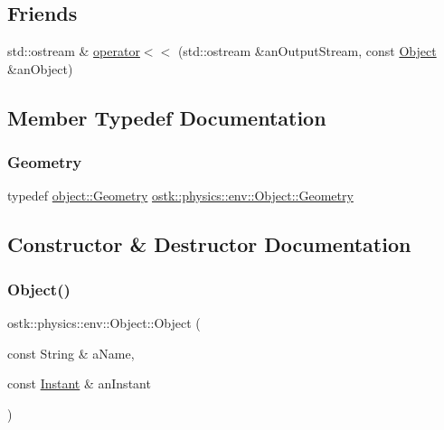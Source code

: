 \subsection*{Friends}
\begin{DoxyCompactItemize}
\item 
std\+::ostream \& \hyperlink{classostk_1_1physics_1_1env_1_1_object_a418df9bf4a73078f3d494edef1743f8d}{operator$<$$<$} (std\+::ostream \&an\+Output\+Stream, const \hyperlink{classostk_1_1physics_1_1env_1_1_object}{Object} \&an\+Object)
\end{DoxyCompactItemize}


\subsection{Member Typedef Documentation}
\mbox{\label{classostk_1_1physics_1_1env_1_1_object_a66e44a65aefb23a184a6de531e96935d}} 
\subsubsection{\texorpdfstring{Geometry}{Geometry}}
{\footnotesize\ttfamily typedef \hyperlink{classostk_1_1physics_1_1env_1_1object_1_1_geometry}{object\+::\+Geometry} \hyperlink{classostk_1_1physics_1_1env_1_1_object_a66e44a65aefb23a184a6de531e96935d}{ostk\+::physics\+::env\+::\+Object\+::\+Geometry}}



\subsection{Constructor \& Destructor Documentation}
\mbox{\label{classostk_1_1physics_1_1env_1_1_object_acd023212c67c893a753f1f3e2cf5c745}} 
\subsubsection{\texorpdfstring{Object()}{Object()}\hspace{0.1cm}{\footnotesize\ttfamily [1/3]}}
{\footnotesize\ttfamily ostk\+::physics\+::env\+::\+Object\+::\+Object (\begin{DoxyParamCaption}\item[{const String \&}]{a\+Name,  }\item[{const \hyperlink{classostk_1_1physics_1_1time_1_1_instant}{Instant} \&}]{an\+Instant }\end{DoxyParamCaption})}


